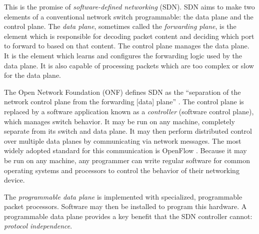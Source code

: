 This is the promise of \emph{software-defined networking} (SDN).
SDN aims to make two elements of a conventional network switch programmable: the data plane and the control plane. The \emph{data plane}, sometimes called the \emph{forwarding plane}, is the element which is responsible for decoding packet content and deciding which port to forward to based on that content. The control plane manages the data plane. It is the element which learns and configures the forwarding logic used by the data plane. It is also capable of processing packets which are too complex or slow for the data plane.

The Open Network
Foundation (ONF) defines SDN as the ``separation of the network control
plane from the forwarding [data] plane'' \cite{onf_sdn_def}.
The control plane is replaced by a software application known as a \emph{controller} (software control plane), which manages switch behavior.
It may be run on any machine, completely separate from its switch and data plane.
It may then perform distributed control over multiple data planes by communicating via network messages.
The most widely adopted standard for this communication is OpenFlow
\cite{openflow_spec}.
Because it may be run on any machine,
any programmer can write regular software for common operating
systems and processors to control the behavior of their networking device.

The \emph{programmable data plane} is implemented with specialized, programmable packet processors.
Software may then be installed to program this hardware.
A programmable data plane provides
a key benefit that the SDN controller cannot: \emph{protocol independence}.




